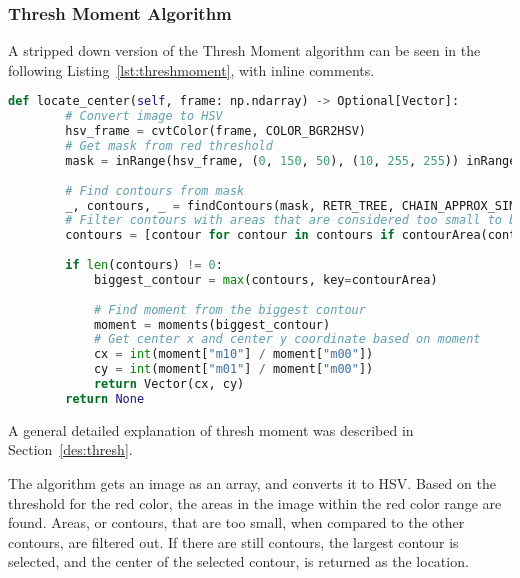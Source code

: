 \subsubsection{Thresh Moment Algorithm}\label{solution:thresh_moment}
A stripped down version of the Thresh Moment algorithm can be seen in the following Listing~\ref{lst:threshmoment}, with inline comments.

\begin{lstlisting}[language=Python,label={lst:threshmoment},caption={Stripped down version of thresh moment from thresh\_moment.py}]
	def locate_center(self, frame: np.ndarray) -> Optional[Vector]:
	    # Convert image to HSV
	    hsv_frame = cvtColor(frame, COLOR_BGR2HSV)
	    # Get mask from red threshold
	    mask = inRange(hsv_frame, (0, 150, 50), (10, 255, 255)) inRange(hsv_frame, (170, 150, 50), (180, 255, 255))
	    
	    # Find contours from mask
	    _, contours, _ = findContours(mask, RETR_TREE, CHAIN_APPROX_SIMPLE)
	    # Filter contours with areas that are considered too small to be the target
	    contours = [contour for contour in contours if contourArea(contour) > 20]
	    
	    if len(contours) != 0:
		    biggest_contour = max(contours, key=contourArea)
		    
		    # Find moment from the biggest contour
		    moment = moments(biggest_contour)
		    # Get center x and center y coordinate based on moment
		    cx = int(moment["m10"] / moment["m00"])
		    cy = int(moment["m01"] / moment["m00"])
		    return Vector(cx, cy)
	    return None
\end{lstlisting}

A general detailed explanation of thresh moment was described in Section~\ref{des:thresh}.

The algorithm gets an image as an array, and converts it to HSV.
Based on the threshold for the red color, the areas in the image within the red color range are found. 
Areas, or contours, that are too small, when compared to the other contours, are filtered out.
If there are still contours, the largest contour is selected, and the center of the selected contour, is returned as the location.